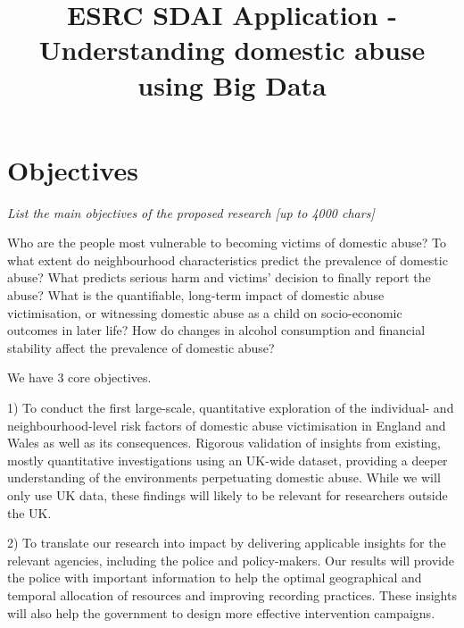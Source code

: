 \documentclass[11pt, a4paper]{article}
\begin{document}
\title{ESRC SDAI Application - Understanding domestic abuse using Big Data}
\date{}
\maketitle
\section{Objectives}

%
%
%
%

\textit{List the main objectives of the proposed research [up to 4000 chars]}

Who are the people most vulnerable to becoming victims of domestic abuse? To what extent do neighbourhood characteristics predict the prevalence of domestic abuse? What predicts serious harm and victims' decision to finally report the abuse? What is the quantifiable, long-term impact of domestic abuse victimisation, or witnessing domestic abuse as a child on socio-economic outcomes in later life? How do changes in alcohol consumption and financial stability affect the prevalence of domestic abuse?

We have 3 core objectives. 

1) To conduct the first large-scale, quantitative exploration of the individual- and neighbourhood-level risk factors of domestic abuse victimisation in England and Wales as well as its consequences. Rigorous validation of insights from existing, mostly quantitative investigations using an UK-wide dataset, providing a deeper understanding of the environments perpetuating domestic abuse. While we will only use UK data, these findings will likely to be relevant for researchers outside the UK. 

2) To translate our research into impact by delivering applicable insights for the relevant agencies, including the police and policy-makers. Our results will provide the police with important information to help the optimal geographical and temporal allocation of resources and improving recording practices. These insights will also help the government to design more effective intervention campaigns.
\end{document}
